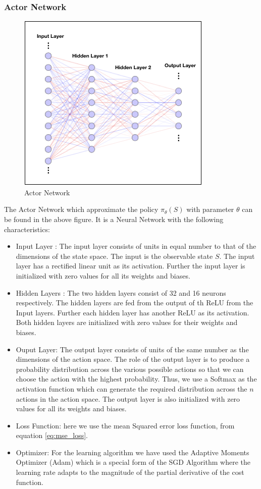 \documentclass[12pt]{extarticle}
\numberwithin{equation}{section}
\begin{document}
	\subsubsection{Actor Network}
	\begin{figure}[h]
		\vspace{0.2cm}
		\centering
		\includegraphics[scale=0.6]{nn-actor}
		\caption{Actor Network
			\label{nn-actor}}
	\end{figure}
	The Actor Network which approximate the policy $\pi_{\theta}(S)$ with parameter $\theta$ can be found in the above figure. It is a Neural Network with the following characteristics:
	\begin{itemize}
		\item Input Layer : The input layer consists of units in equal number to that of the dimensions of the state space. The input is the observable state $S$. The input layer has a rectified linear unit as its activation. Further the input layer is initialized with zero values for all its weights and biases. 
		\item Hidden Layers : The two hidden layers consist of 32 and 16 neurons respectively. The hidden layers are fed from the output of th ReLU from the Input layers. Further each hidden layer has another ReLU as its activation. Both hidden layers are initialized with zero values for their weights and biases.
		\item Ouput Layer: The output layer consists of units of the same number as the dimensions of the action space. The role of the output layer is to produce a probability distribution across the various possible actions so that we can choose the action with the highest probability. Thus, we use a Softmax as the activation function which can generate the required distribution across the $n$ actions in the action space. The output layer is also initialized with zero values for all its weights and biases.
		\item Loss Function: here we use the mean Squared error loss function, from equation \eqref{eq:mse_loss}.
		\item Optimizer: For the learning algorithm we have used the Adaptive Moments Optimizer (Adam)\cite{kingma2014adam} which is a special form of the SGD Algorithm where the learning rate adapts to the magnitude of the partial derivative of the cost function. 
	\end{itemize}
\end{document}
